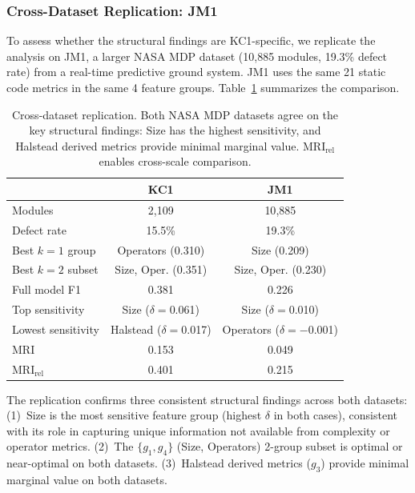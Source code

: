 \documentclass[manuscript,review,anonymous]{acmart}
\newcommand{\MRI}{\mathrm{MRI}}
\begin{document}
\subsubsection{Cross-Dataset Replication: JM1}

To assess whether the structural findings are KC1-specific, we replicate the analysis on JM1, a larger NASA MDP dataset (10{,}885 modules, 19.3\% defect rate) from a real-time predictive ground system.
JM1 uses the same 21 static code metrics in the same 4 feature groups.
Table~\ref{tab:cross_dataset} summarizes the comparison.

\begin{table}[t]
\centering
\caption{Cross-dataset replication. Both NASA MDP datasets agree on the key structural findings: Size has the highest sensitivity, and Halstead derived metrics provide minimal marginal value. $\MRI_{\mathrm{rel}}$ enables cross-scale comparison.}
\label{tab:cross_dataset}
\small
\begin{tabular}{@{}lcc@{}}
\toprule
& \textbf{KC1} & \textbf{JM1} \\
\midrule
Modules & 2{,}109 & 10{,}885 \\
Defect rate & 15.5\% & 19.3\% \\
\midrule
Best $k{=}1$ group & Operators (0.310) & Size (0.209) \\
Best $k{=}2$ subset & Size, Oper. (0.351) & Size, Oper. (0.230) \\
Full model F1 & 0.381 & 0.226 \\
\midrule
Top sensitivity & Size ($\delta{=}$0.061) & Size ($\delta{=}$0.010) \\
Lowest sensitivity & Halstead ($\delta{=}$0.017) & Operators ($\delta{=}{-}$0.001) \\
\midrule
$\MRI$ & 0.153 & 0.049 \\
$\MRI_{\mathrm{rel}}$ & 0.401 & 0.215 \\
\bottomrule
\end{tabular}
\end{table}

The replication confirms three consistent structural findings across both datasets:
(1)~Size is the most sensitive feature group (highest $\delta$ in both cases), consistent with its role in capturing unique information not available from complexity or operator metrics.
(2)~The $\{g_1, g_4\}$ (Size, Operators) 2-group subset is optimal or near-optimal on both datasets.
(3)~Halstead derived metrics ($g_3$) provide minimal marginal value on both datasets.
\end{document}
